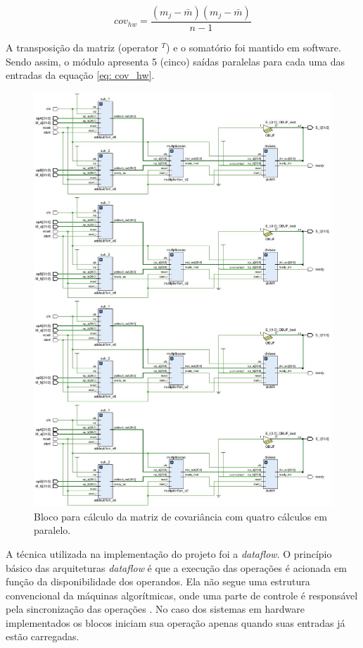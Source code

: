 \begin{equation}
\label{eq: cov_hw}
cov_{hw} = \frac{(m_j - \bar m)(m_j -\bar m)}{n - 1} 
\end{equation}

A transposição da matriz (operator $^T$) e o somatório foi mantido em software. Sendo assim, o módulo apresenta 5 (cinco) saídas paralelas para cada uma das entradas da equação \ref{eq: cov_hw}.\\
\newpage

\begin{figure}[h]
	\centering
	\includegraphics[keepaspectratio=true,scale=0.35]{figuras/rtl_covariancia.png}
	\caption{Bloco para cálculo da matriz de covariância com quatro cálculos em paralelo.}
	\label{covariancia}
\end{figure}

A técnica utilizada na implementação do projeto foi a \textit{dataflow}. O princípio básico das arquiteturas \textit{dataflow} é que a execução das operações é acionada em função da disponibilidade dos operandos. Ela não segue uma estrutura convencional da máquinas algorítmicas, onde uma parte de controle é responsável pela sincronização das operações \cite{ThiagoUnB}. No caso dos sistemas em hardware implementados os blocos iniciam sua operação apenas quando suas entradas já estão carregadas.

